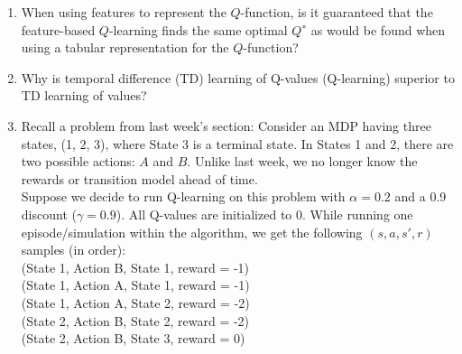 \documentclass[a4paper]{article}
\newif\ifsol
\begin{document}
\begin{enumerate}
    \ifsol
        \textcolor{blue}{If the MDP is deterministic, Direct Evaluation would assign the exact value of every visited state under the given policy, so the number of necessary experiments would be no larger than the total number of start states. If the MDP is not deterministic, we do not have this guarantee, since separate experiments would have different returns.}
    \else
        \vspace{7em}
    \fi 
    
    \item When using features to represent the $Q$-function, is it guaranteed that the feature-based $Q$-learning finds the same optimal $Q^∗$ as would be found when using a tabular representation for the $Q$-function?
    
    \ifsol
        \textcolor{blue}{No -- the optimal Q-function $Q∗$ would depend on the choice of features. Even if the choice of features was fully informed, it may not be possible to represent the optimal $Q^*$ with a (linear) weighted combination of features.}
    \else
        \vspace{7em}
    \fi
    
    \item Why is temporal difference (TD) learning of Q-values (Q-learning) superior to TD learning of values?
    
    \ifsol
        \textcolor{blue}{If only values are found, it is difficult to extract a policy -- this would require knowing or calculating the transition function. If Q-values are found, the policy can be easily computed by $\pi(s) = \text{argmax}_a \; Q(s, a)$.}
    \else
        \vspace{7em}
    \fi
    
    \newpage
    \item Recall a problem from last week's section: Consider an MDP having three states, (1, 2, 3), where State 3 is a terminal state. In States 1 and 2, there are two possible actions: $A$ and $B$. Unlike last week, we no longer know the rewards or transition model ahead of time. \\
    
    Suppose we decide to run Q-learning on this problem with $\alpha = 0.2$ and a 0.9 discount ($\gamma = 0.9$). All Q-values are initialized to 0. While running one episode/simulation within the algorithm, we get the following $(s, a, s', r)$ samples (in order): \\
    
    (State 1, Action B, State 1, reward = -1) \\
    (State 1, Action A, State 1, reward = -1) \\
    (State 1, Action A, State 2, reward = -2) \\
    (State 2, Action B, State 2, reward = -2) \\
    (State 2, Action B, State 3, reward = 0) \\
    

\end{enumerate}
\end{document}
